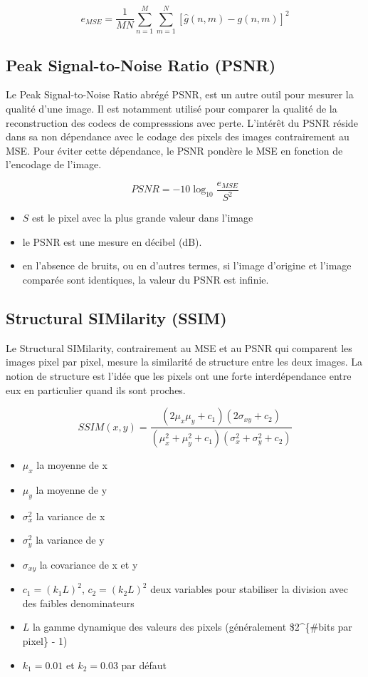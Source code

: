 \documentclass[]{article}
\providecommand{\tightlist}{%
  \setlength{\itemsep}{0pt}\setlength{\parskip}{0pt}}
\begin{document}
\[e_{MSE} = \frac{1}{M N} \sum_{n=1}^{M} \sum_{m=1}^{N}[\hat{g}(n, m) - g(n, m)]^2\]

\hypertarget{peak-signal-to-noise-ratio-psnr}{%
\subsection{Peak Signal-to-Noise Ratio
(PSNR)}\label{peak-signal-to-noise-ratio-psnr}}

Le Peak Signal-to-Noise Ratio abrégé PSNR, est un autre outil pour
mesurer la qualité d'une image. Il est notamment utilisé pour comparer
la qualité de la reconstruction des codecs de compresssions avec perte.
L'intérêt du PSNR réside dans sa non dépendance avec le codage des
pixels des images contrairement au MSE. Pour éviter cette dépendance, le
PSNR pondère le MSE en fonction de l'encodage de l'image.

\[PSNR = -10\log_{10}\frac{e_{MSE}}{S^2}\]

\begin{itemize}
\tightlist
\item
  \(S\) est le pixel avec la plus grande valeur dans l'image
\item
  le PSNR est une mesure en décibel (dB).
\item
  en l'absence de bruits, ou en d'autres termes, si l'image d'origine et
  l'image comparée sont identiques, la valeur du PSNR est infinie.
\end{itemize}

\hypertarget{structural-similarity-ssim}{%
\subsection{Structural SIMilarity
(SSIM)}\label{structural-similarity-ssim}}

Le Structural SIMilarity, contrairement au MSE et au PSNR qui comparent
les images pixel par pixel, mesure la similarité de structure entre les
deux images. La notion de structure est l'idée que les pixels ont une
forte interdépendance entre eux en particulier quand ils sont proches.

\[SSIM(x, y) = \frac{(2\mu_x\mu_y + c_1)(2\sigma_{xy}+ c_2)}{(\mu^2_x + \mu^2_y + c_1)(\sigma^2_x + \sigma^2_y + c_2)}\]

\begin{itemize}
\tightlist
\item
  \(\mu_{x}\) la moyenne de x
\item
  \(\mu_{y}\) la moyenne de y
\item
  \(\sigma^2_{x}\) la variance de x
\item
  \(\sigma^2_{y}\) la variance de y
\item
  \(\sigma_{xy}\) la covariance de x et y
\item
  \(c_{1}=(k_{1}L)^2\), \(c_{2}=(k_{2}L)^2\) deux variables pour
  stabiliser la division avec des faibles denominateurs
\item
  \(L\) la gamme dynamique des valeurs des pixels (généralement
  \$2\^{}\{\#bits par pixel\} - 1)
\item
  \(k_1=0.01\) et \(k_2=0.03\) par défaut
\end{itemize}
\end{document}
